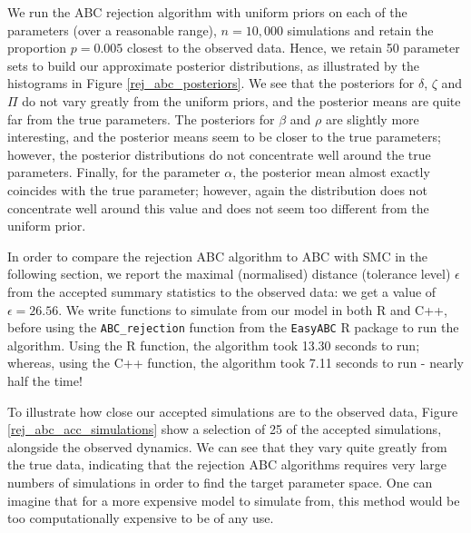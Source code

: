 \documentclass[]{article}
\begin{document}
We run the ABC rejection algorithm with uniform priors on each of the parameters (over a reasonable range), $n=10,000$ simulations and retain the proportion $p=0.005$ closest to the observed data. Hence, we retain 50 parameter sets to build our approximate posterior distributions, as illustrated by the histograms in Figure \ref{rej_abc_posteriors}. We see that the posteriors for $\delta$, $\zeta$ and $\Pi$ do not vary greatly from the uniform priors, and the posterior means are quite far from the true parameters. The posteriors for $\beta$ and $\rho$ are slightly more interesting, and the posterior means seem to be closer to the true parameters; however, the posterior distributions do not concentrate well around the true parameters. Finally, for the parameter $\alpha$, the posterior mean almost exactly coincides with the true parameter; however, again the distribution does not concentrate well around this value and does not seem too different from the uniform prior.

In order to compare the rejection ABC algorithm to ABC with SMC in the following section, we report the maximal (normalised) distance (tolerance level) $\epsilon$ from the accepted summary statistics to the observed data: we get a value of $\epsilon = 26.56$. We write functions to simulate from our model in both R and C++, before using the \texttt{ABC\_rejection} function from the \texttt{EasyABC} R package to run the algorithm. Using the R function, the algorithm took 13.30 seconds to run; whereas, using the C++ function, the algorithm took 7.11 seconds to run - nearly half the time!



To illustrate how close our accepted simulations are to the observed data, Figure \ref{rej_abc_acc_simulations} show a selection of 25 of the accepted simulations, alongside the observed dynamics. We can see that they vary quite greatly from the true data, indicating that the rejection ABC algorithms requires very large numbers of simulations in order to find the target parameter space. One can imagine that for a more expensive model to simulate from, this method would be too computationally expensive to be of any use.
\end{document}
